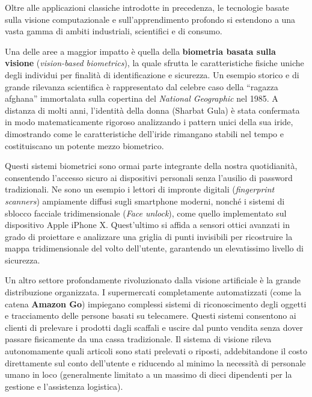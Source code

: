 ﻿\documentclass[11pt, a4paper]{article}
\begin{document}
Oltre alle applicazioni classiche introdotte in precedenza, le tecnologie basate sulla visione computazionale e sull'apprendimento profondo si estendono a una vasta gamma di ambiti industriali, scientifici e di consumo.

Una delle aree a maggior impatto è quella della \textbf{biometria basata sulla visione} (\emph{vision-based biometrics}), la quale sfrutta le caratteristiche fisiche uniche degli individui per finalità di identificazione e sicurezza. Un esempio storico e di grande rilevanza scientifica è rappresentato dal celebre caso della \enquote{ragazza afghana} immortalata sulla copertina del \emph{National Geographic} nel 1985. A distanza di molti anni, l'identità della donna (Sharbat Gula) è stata confermata in modo matematicamente rigoroso analizzando i pattern unici della sua iride, dimostrando come le caratteristiche dell'iride rimangano stabili nel tempo e costituiscano un potente mezzo biometrico.



Questi sistemi biometrici sono ormai parte integrante della nostra quotidianità, consentendo l'accesso sicuro ai dispositivi personali senza l'ausilio di password tradizionali. Ne sono un esempio i lettori di impronte digitali (\emph{fingerprint scanners}) ampiamente diffusi sugli smartphone moderni, nonché i sistemi di sblocco facciale tridimensionale (\emph{Face unlock}), come quello implementato sul dispositivo Apple iPhone X. Quest'ultimo si affida a sensori ottici avanzati in grado di proiettare e analizzare una griglia di punti invisibili per ricostruire la mappa tridimensionale del volto dell'utente, garantendo un elevatissimo livello di sicurezza.


Un altro settore profondamente rivoluzionato dalla visione artificiale è la grande distribuzione organizzata. I supermercati completamente automatizzati (come la catena \textbf{Amazon Go}) impiegano complessi sistemi di riconoscimento degli oggetti e tracciamento delle persone basati su telecamere. Questi sistemi consentono ai clienti di prelevare i prodotti dagli scaffali e uscire dal punto vendita senza dover passare fisicamente da una cassa tradizionale. Il sistema di visione rileva autonomamente quali articoli sono stati prelevati o riposti, addebitandone il costo direttamente sul conto dell'utente e riducendo al minimo la necessità di personale umano in loco (generalmente limitato a un massimo di dieci dipendenti per la gestione e l'assistenza logistica).
\end{document}
